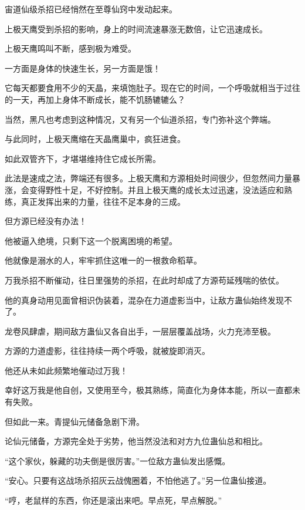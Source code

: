 
\begin{this_body}



宙道仙级杀招已经悄然在至尊仙窍中发动起来。

上极天鹰受到杀招的影响，身上的时间流速暴涨无数倍，让它迅速成长。

上极天鹰鸣叫不断，感到极为难受。

一方面是身体的快速生长，另一方面是饿！

它每天都要食用不少的天晶，来填饱肚子。现在它的时间，一个呼吸就相当于过往的一天，再加上身体不断成长，能不饥肠辘辘么？

当然，黑凡也考虑到这种情况，又有另一个仙道杀招，专门弥补这个弊端。

与此同时，上极天鹰缩在天晶鹰巢中，疯狂进食。

如此双管齐下，才堪堪维持住它成长所需。

此法是速成之法，弊端还有很多。上极天鹰和方源相处时间很少，但忽然间力量暴涨，会变得野性十足，不好控制。并且上极天鹰的成长太过迅速，没法适应和熟练，真正发挥出来的力量，往往不足本身的三成。

但方源已经没有办法！

他被逼入绝境，只剩下这一个脱离困境的希望。

他就像是溺水的人，牢牢抓住这唯一的一根救命稻草。

万我杀招不断催动，往日里强势的杀招，在此时却成了方源苟延残喘的依仗。

他的真身动用见面曾相识伪装着，混杂在力道虚影当中，让敌方蛊仙始终发现不了。

龙卷风肆虐，期间敌方蛊仙又各自出手，一层层覆盖战场，火力充沛至极。

方源的力道虚影，往往持续一两个呼吸，就被旋即消灭。

他还从未如此频繁地催动过万我！

幸好这万我是他自创，又使用至今，极其熟练，简直化为身体本能，所以一直都未有失败。

但如此一来。青提仙元储备急剧下滑。

论仙元储备，方源完全处于劣势，他当然没法和对方九位蛊仙总和相比。

“这个家伙，躲藏的功夫倒是很厉害。”一位敌方蛊仙发出感慨。

“安心。只要有这战场杀招灰云战傀圈着，不怕他逃了。”另一位蛊仙接道。

“哼，老鼠样的东西，你还是滚出来吧。早点死，早点解脱。”


\end{this_body}
